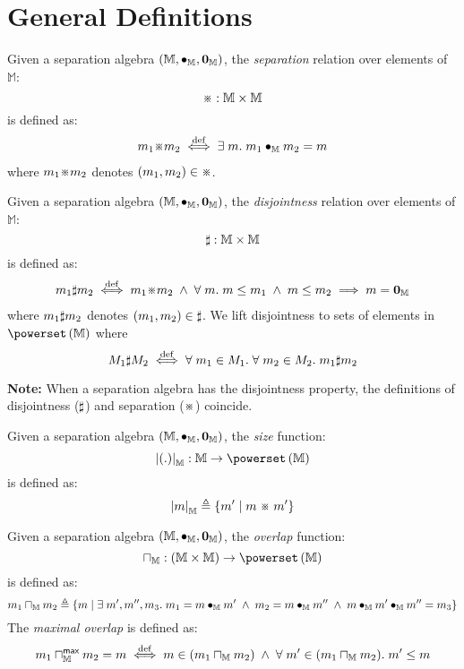\section*{General Definitions}
%
\begin{definition}[Separation]
Given a separation algebra $\left(\mathbb{M}, \bullet_{\mathbb{M}}, \mathbf{0}_{\mathbb{M}} \right)$, the \emph{separation} relation over elements of $\mathbb{M}$:
%
\[
\separate : \mathbb{M} \times \mathbb{M}
\]
%
is defined as:
%
\[
\begin{array}{l}
	m_1 \separate m_2 \iffdef \exsts{m} m_1 \compose{\mathbb{M}} m_2 = m 
\end{array}
\]
%
where $m_1 \separate m_2$ denotes $(m_1, m_2) \in \separate$. 
\end{definition}
%
%
\begin{definition}[Disjointness]
Given a separation algebra $\left(\mathbb{M}, \bullet_{\mathbb{M}}, \mathbf{0}_{\mathbb{M}} \right)$, the \emph{disjointness} relation over elements of $\mathbb{M}$:
%
\[
\sharp : \mathbb{M} \times \mathbb{M}
\]
%
is defined as:
%
\[
\begin{array}{l}
	m_1 \disjoint m_2 \iffdef m_1 \separate m_2 \;\land\; \for{m} m \leq m_1 \;\land\; m \leq m_2 \implies m = \unit{\mathbb{M}}
\end{array}
\]
%
where $m_1 \sharp m_2$ denotes $(m_1, m_2) \in \sharp$. We lift disjointness to sets of elements in $\pset{\mathbb{M}}$ where
%
\[
	M_1 \sharp M_2 \stackrel{\mathrm{def}}{\iff} \forall\; m_1 \in M_1.\;\forall\; m_2 \in M_2.\; m_1 \sharp m_2
\]
%
\end{definition}
%
%
\noindent\textbf{Note: } When a separation algebra has the disjointness property, the definitions of disjointness ($\sharp$) and separation ($\separate$) coincide.
%
%
\begin{definition}
Given a separation algebra $\left(\mathbb{M}, \bullet_{\mathbb{M}}, \mathbf{0}_{\mathbb{M}} \right)$, the \emph{size} function:
%
\[
\size{\blankArg}{\mathbb{M}} : \mathbb{M} \rightarrow \pset{\mathbb{M}}
\]
%
is defined as:
%
\[
	\size{m}{\mathbb{M}} \eqdef \left\{ m' \;|\; m \;\separate\; m'\right\}
\]
%
%
\end{definition}
%
%
\begin{definition}[Overlap]
Given a separation algebra $\left(\mathbb{M}, \bullet_{\mathbb{M}}, \mathbf{0}_{\mathbb{M}} \right)$, the \emph{overlap} function:
%
\[
\meet{\mathbb{M}} : \left(\mathbb{M} \times \mathbb{M} \right)\rightarrow \pset{\mathbb{M}}
\]
%
is defined as:
%
\[
	m_1 \sqcap_{\mathbb{M}} m_2 \triangleq \left\{ m \;|\; \exists\; m', m'', m_3.\; m_1 = m \bullet_{\mathbb{M}} m' \;\land\; m_2 = m \bullet_{\mathbb{M}} m'' \;\land\; m \bullet_{\mathbb{M}} m' \bullet_{\mathbb{M}} m'' = m_3 \right\}
\]
%
The \emph{maximal overlap} is defined as:
%
\[
	m_1 \sqcap_{\mathbb{M}}^{\textsf{max}} m_2 = m \stackrel{\mathrm{def}}{\iff} m \in (m_1 \sqcap_{\mathbb{M}} m_2) \;\land\; \forall\; m' \in (m_1 \sqcap_{\mathbb{M}} m_2).\; m' \leq m
\]
%
\end{definition}
